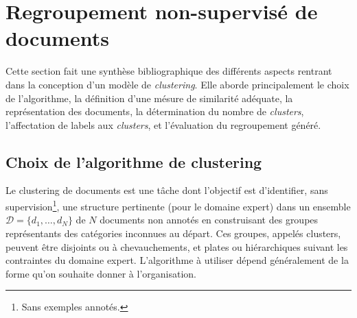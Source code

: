 
\section{Regroupement non-supervisé de documents}
\label{sec:similarite:biblio}

Cette section fait une synthèse bibliographique des différents aspects rentrant dans la conception d'un modèle de \textit{clustering}. Elle aborde principalement le choix de l'algorithme, la définition d'une mésure de similarité adéquate, la représentation des documents, la détermination du nombre de \textit{clusters}, l'affectation de labels aux \textit{clusters}, et l'évaluation du regroupement généré.

\subsection{Choix de l’algorithme de clustering}

Le clustering de documents est une tâche dont l'objectif est d'identifier, sans supervision\footnote{Sans exemples annotés.}, une structure pertinente (pour le domaine expert) dans un ensemble $\mathcal{D} = \lbrace d_1, \dots, d_N \rbrace$ de $N$ documents non annotés en construisant des groupes représentants des catégories inconnues au départ. Ces groupes, appelés clusters, peuvent être disjoints ou à chevauchements, et plates ou hiérarchiques suivant les contraintes du domaine expert. L’algorithme à utiliser dépend généralement de la forme qu’on souhaite donner à l’organisation. 

